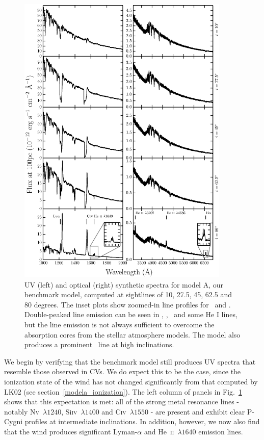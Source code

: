 \documentclass[preprint, a4paper, 11pt]{aastex}
\begin{document}
\begin{figure} %
\includegraphics[width=0.9\textwidth]{figures/modela_uv_opt.eps}
\caption{
UV (left) and optical (right) synthetic spectra for model A, our benchmark model,
computed at sightlines of 10, 27.5, 45, 62.5 and 80 degrees.	
The inset plots show zoomed-in line profiles for 
\heiiuv\ and \ha. Double-peaked line emission can be seen in 
\heiiuv, \heiiopt, \ha\ and some He I lines, but the 
line emission is not always sufficient to overcome the absorption
cores from the stellar atmosphere models. The model
also produces a prominent \heiioptnew\ line at high inclinations.
}
\label{spec}
\end{figure} %

We begin by verifying that the benchmark model still produces UV
spectra that resemble those observed in CVs. We do expect this to be
the case, since the ionization state of the wind has not changed
significantly from that computed by LK02 (see section~\ref{modela_ionization}). 
The left column of panels in Fig.~\ref{spec} shows that this expectation
is met: all of the strong metal resonance
lines - notably N\textsc{v}~$\lambda1240$,
Si\textsc{iv}~$\lambda1400$ and C\textsc{iv}~$\lambda1550$ - 
are present and exhibit clear P-Cygni profiles
at intermediate inclinations. In addition, however, we now also find
that the wind produces significant Lyman-$\alpha$ and
He~\textsc{ii}~$\lambda1640$ emission lines. 
\end{document}
